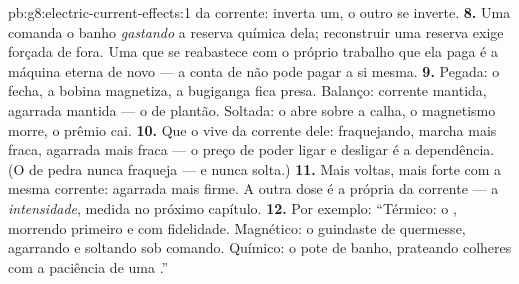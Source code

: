 \begin{solution}{pb:g8:electric-current-effects:1}
da corrente: inverta um, o outro se inverte.
\textbf{8.} Uma  comanda o banho \emph{gastando} a reserva
química dela; reconstruir uma reserva exige  forçada de fora.
Uma  que se reabastece com o próprio trabalho que ela paga é a
máquina eterna de novo --- a conta de  não pode pagar a si
mesma.
\textbf{9.} Pegada: o  fecha, a bobina magnetiza, a
bugiganga fica presa. Balanço: corrente mantida, agarrada mantida ---
o  de plantão. Soltada: o  abre sobre a
calha, o magnetismo morre, o prêmio cai.
\textbf{10.} Que o  vive da corrente dele:  fraquejando,
marcha mais fraca, agarrada mais fraca --- o preço de poder ligar e
desligar é a dependência. (O  de pedra nunca fraqueja --- e nunca
solta.)
\textbf{11.} Mais voltas,  mais forte com a mesma corrente:
agarrada mais firme. A outra dose é a própria  da corrente --- a
\emph{intensidade}, medida no próximo capítulo.
\textbf{12.} Por exemplo: ``Térmico: o , morrendo primeiro e
com fidelidade. Magnético: o guindaste de quermesse, agarrando e
soltando sob comando. Químico: o pote de banho, prateando colheres
com a paciência de uma .''
\end{solution}
